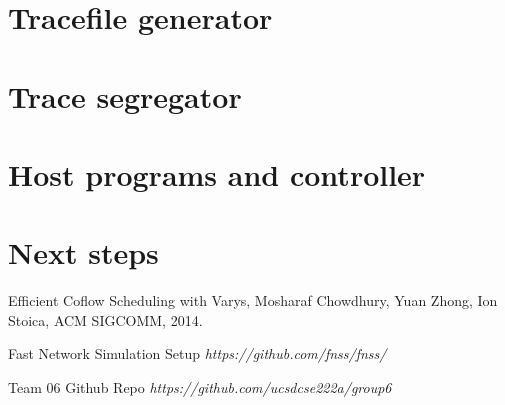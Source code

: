 \documentclass{article}
\begin{document}
\section{Tracefile generator}


\section{Trace segregator}

\section{Host programs and controller}

\section{Next steps}



\begin{thebibliography}{10}
Efficient Coflow Scheduling with Varys, Mosharaf Chowdhury, Yuan Zhong, Ion Stoica, ACM SIGCOMM, 2014.

Fast Network Simulation Setup \textit{https://github.com/fnss/fnss/}

Team 06 Github Repo \textit{https://github.com/ucsdcse222a/group6}

\end{thebibliography}
\end{document}
